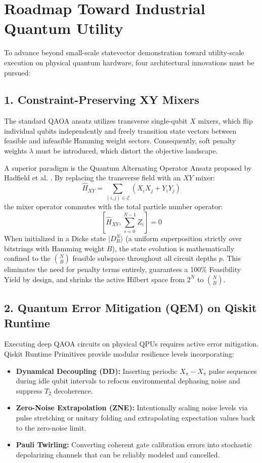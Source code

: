 \section{Roadmap Toward Industrial Quantum Utility}
To advance beyond small-scale statevector demonstration toward utility-scale execution on physical quantum hardware, four architectural innovations must be pursued:

\subsection{1. Constraint-Preserving XY Mixers}
The standard QAOA ansatz utilizes transverse single-qubit $X$ mixers, which flip individual qubits independently and freely transition state vectors between feasible and infeasible Hamming weight sectors. Consequently, soft penalty weights $\lambda$ must be introduced, which distort the objective landscape.

A superior paradigm is the Quantum Alternating Operator Ansatz proposed by Hadfield et al. \cite{hadfield2019quantum}. By replacing the transverse field with an $XY$ mixer:
\begin{equation}
\hat{H}_{XY} = \sum_{(i, j) \in \mathcal{E}} \left( X_i X_j + Y_i Y_j \right)
\end{equation}
the mixer operator commutes with the total particle number operator:
\begin{equation}
\left[ \hat{H}_{XY}, \sum_{i=0}^{N-1} Z_i \right] = 0
\end{equation}
When initialized in a Dicke state $|D_B^N\rangle$ (a uniform superposition strictly over bitstrings with Hamming weight $B$), the state evolution is mathematically confined to the $\binom{N}{B}$ feasible subspace throughout all circuit depths $p$. This eliminates the need for penalty terms entirely, guarantees a 100\% Feasibility Yield by design, and shrinks the active Hilbert space from $2^N$ to $\binom{N}{B}$.

\subsection{2. Quantum Error Mitigation (QEM) on Qiskit Runtime}
Executing deep QAOA circuits on physical QPUs requires active error mitigation. Qiskit Runtime Primitives provide modular resilience levels incorporating:
\begin{itemize}
    \item \textbf{Dynamical Decoupling (DD):} Inserting periodic $X_\pi - X_\pi$ pulse sequences during idle qubit intervals to refocus environmental dephasing noise and suppress $T_2$ decoherence.
    \item \textbf{Zero-Noise Extrapolation (ZNE):} Intentionally scaling noise levels via pulse stretching or unitary folding and extrapolating expectation values back to the zero-noise limit.
    \item \textbf{Pauli Twirling:} Converting coherent gate calibration errors into stochastic depolarizing channels that can be reliably modeled and cancelled.
\end{itemize}


